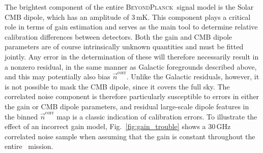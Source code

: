 \documentclass{aa}
\newcommand{\n}[0]{\vec{n}}
\newcommand{\BP}{\textsc{BeyondPlanck}}
\begin{document}
The brightest component of the entire \BP\ signal model is the Solar
CMB dipole, which has an amplitude of 3\,mK. This component plays a
critical role in terms of gain estimation \citep{bp07} and serves as
the main tool to determine relative calibration differences between
detectors. Both the gain and CMB dipole parameters are of course
intrinsically unknown quantities and must be fitted jointly. Any
error in the determination of these will therefore necessarily result
in a nonzero residual, in the same manner as Galactic foregrounds
described above, and this may potentially also bias
$\n^{\mathrm{corr}}$. Unlike the Galactic residuals, however, it is
not possible to mask the CMB dipole, since it covers the full sky. The
correlated noise component is therefore particularly susceptible to
errors in either the gain or CMB dipole parameters, and residual
large-scale dipole features in the binned $\n^{\mathrm{corr}}$ map is
a classic indication of calibration errors. To illustrate the effect
of an incorrect gain model, Fig.~\ref{fig:gain_trouble} shows a
30\,GHz correlated noise sample when assuming that the gain is
constant throughout the entire \Planck\ mission.
\end{document}
